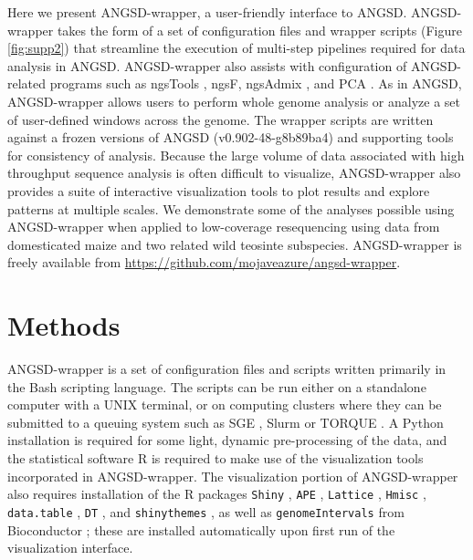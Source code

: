 \documentclass[10pt,a4paper]{article}
\begin{document}
Here we present ANGSD-wrapper, a user-friendly interface to ANGSD. 
ANGSD-wrapper takes the form of a set of configuration files and wrapper scripts (Figure \ref{fig:supp2}) that streamline the execution of multi-step pipelines required for data analysis in ANGSD. 
ANGSD-wrapper also assists with configuration of ANGSD-related programs such as ngsTools \citep{fumagalli2014ngstools}, ngsF\citep{vieira2013estimating}, ngsAdmix \citep{pmid24026093}, and PCA \citep{fumagalli2013quantifying}. 
As in ANGSD, ANGSD-wrapper allows users to perform whole genome analysis or analyze a set of user-defined windows across the genome.
The wrapper scripts are written against a frozen versions of ANGSD (v0.902-48-g8b89ba4) and supporting tools for consistency of analysis. 
Because the large volume of data associated with high throughput sequence analysis is often difficult to visualize, ANGSD-wrapper also provides a suite of interactive visualization tools to plot results and explore patterns at multiple scales.  
We demonstrate some of the analyses possible using ANGSD-wrapper when applied to low-coverage resequencing using data from domesticated maize and two related wild teosinte subspecies. 
ANGSD-wrapper is freely available from \url{https://github.com/mojaveazure/angsd-wrapper}.

\section*{Methods}
ANGSD-wrapper is a set of configuration files and scripts written primarily in the Bash scripting language. 
The scripts can be run either on a standalone computer with a UNIX terminal, or on computing clusters where they can be submitted to a queuing system such as SGE \citep{Microsystems):2001:SGE:560889.792378}, Slurm \citep{Jette02slurm:simple} or TORQUE \citep{Staples:2006:TRM:1188455.1188464}. 
A Python installation \citep{Python} is required for some light, dynamic pre-processing of the data, and the statistical software R \citep{Rcitation} is required to make use of the visualization tools incorporated in ANGSD-wrapper.  
The visualization portion of ANGSD-wrapper also requires installation of the R packages \texttt{Shiny} \citep{shiny}, \texttt{APE} \citep{APE}, \texttt{Lattice} \citep{lattice}, \texttt{Hmisc} \citep{Hmisc}, \texttt{data.table} \citep{datatable}, \texttt{DT} \citep{javascriptDT}, and \texttt{shinythemes} \citep{shinythemes}, as well as \texttt{genomeIntervals} \citep{genomeIntervals} from Bioconductor \citep{bioconductor}; these are installed automatically upon first run of the visualization interface.
\end{document}
